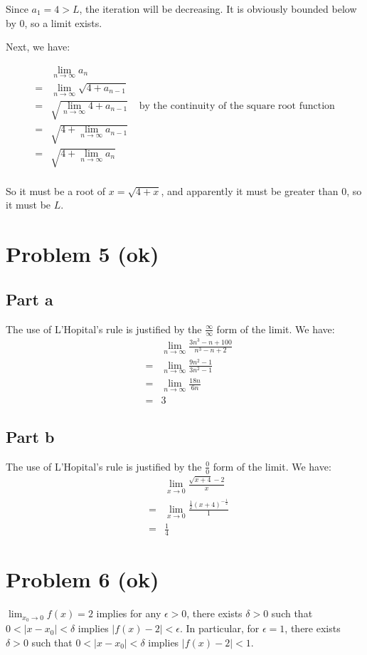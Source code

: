\documentclass{article}
\begin{document}
Since $ a_1 = 4 > L $, the iteration will be decreasing. It is obviously bounded below by 0, so a limit exists.

Next, we have:

\begin{align*}
   & \lim_{n \to \infty} a_n \\
  =& \lim_{n \to \infty} \sqrt{4 + a_{n-1}} \\
  =& \sqrt{\lim_{n \to \infty} 4 + a_{n-1}} & \text{ by the continuity of the square root function} \\
  =& \sqrt{4 + \lim_{n \to \infty} a_{n-1}} \\
  =& \sqrt{4 + \lim_{n \to \infty} a_{n}} \\
\end{align*}

So it must be a root of $ x = \sqrt{4 + x} $, and apparently it must be greater than 0, so it must be $ L $.

\section*{Problem 5 (ok)}
\subsection*{Part a}
The use of L'Hopital's rule is justified by the $ \frac{\infty}{\infty} $ form of the limit. We have:
\begin{eqnarray*}
  & & \lim_{n \to \infty}\frac{3n^3 - n + 100}{n^3 - n + 2} \\
  &=& \lim_{n \to \infty}\frac{9n^2 - 1}{3n^2 - 1} \\
  &=& \lim_{n \to \infty}\frac{18n}{6n} \\
  &=& 3 
\end{eqnarray*}

\subsection*{Part b}
The use of L'Hopital's rule is justified by the $ \frac{0}{0} $ form of the limit. We have:
\begin{eqnarray*}
  & & \lim_{x \to 0}\frac{\sqrt{x + 4} - 2}{x} \\
  &=& \lim_{x \to 0}\frac{\frac{1}{2}(x + 4)^{-\frac{1}{2}}}{1} \\
  &=& \frac{1}{4} 
\end{eqnarray*}

\section*{Problem 6 (ok)}
$ \lim_{x_0 \to 0} f(x) = 2 $ implies for any $ \epsilon > 0 $, there exists $ \delta > 0 $ such that $ 0 < |x - x_0| < \delta $ implies $ |f(x) - 2| < \epsilon $. In particular, for $ \epsilon = 1 $, there exists $ \delta > 0 $ such that $ 0 < |x - x_0| < \delta $ implies $ |f(x) - 2| < 1 $.
\end{document}
